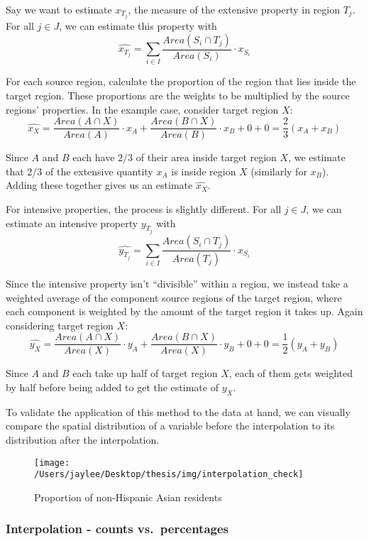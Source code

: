 \documentclass[12pt,twoside]{reedthesis}
\theoremstyle{definition}
\theoremstyle{definition}
\theoremstyle{definition}
\theoremstyle{remark}
\begin{document}
Say we want to estimate \(x_{T_j}\), the measure of the extensive
property in region \(T_j\). For all \(j \in J\), we can estimate this
property with \[
\widehat{x_{T_j}} = \sum_{i \in I} \frac{Area(S_i \cap T_j)}{Area(S_i)} \cdot x_{S_i}
\]

For each source region, calculate the proportion of the region that lies
inside the target region. These proportions are the weights to be
multiplied by the source regions' properties. In the example case,
consider target region \(X\): \[
\widehat{x_X} = \frac{Area(A \cap X)}{Area(A)} \cdot x_{A} + \frac{Area(B \cap X)}{Area(B)} \cdot x_{B} + 0 + 0 = \frac{2}{3}(x_A + x_B)
\]

Since \(A\) and \(B\) each have \(2/3\) of their area inside target
region \(X\), we estimate that 2/3 of the extensive quantity \(x_A\) is
inside region \(X\) (similarly for \(x_B\)). Adding these together gives
us an estimate \(\widehat{x_X}\).

For intensive properties, the process is slightly different. For all
\(j \in J\), we can estimate an intensive property \(y_{T_j}\) with \[
\widehat{y_{T_j}} = \sum_{i \in I} \frac{Area(S_i \cap T_j)}{Area(T_j)} \cdot x_{S_i}
\]

Since the intensive property isn't ``divisible'' within a region, we
instead take a weighted average of the component source regions of the
target region, where each component is weighted by the amount of the
target region it takes up. Again considering target region \(X\): \[
\widehat{y_X} = \frac{Area(A \cap X)}{Area(X)} \cdot y_{A} + \frac{Area(B \cap X)}{Area(X)} \cdot y_{B} + 0 + 0 = \frac{1}{2}(y_A + y_B)
\]

Since \(A\) and \(B\) each take up half of target region \(X\), each of
them gets weighted by half before being added to get the estimate of
\(y_X\).

To validate the application of this method to the data at hand, we can
visually compare the spatial distribution of a variable before the
interpolation to its distribution after the interpolation.
\begin{figure}
\texttt{[image: /Users/jaylee/Desktop/thesis/img/interpolation\_check]} \caption{Proportion of non-Hispanic Asian residents}\label{fig:unnamed-chunk-5}
\end{figure}
\hypertarget{interpolation---counts-vs.percentages}{%
\subsubsection{Interpolation - counts
vs.~percentages}\label{interpolation---counts-vs.percentages}}
\end{document}
